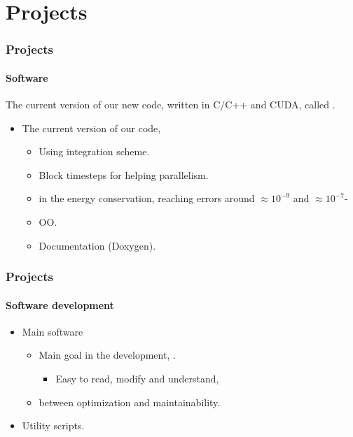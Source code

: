 \section{Projects}
\begin{frame}
    \frametitle{Projects}
    \framesubtitle{Software}

    The current version of our new {\nbody} code,
    written in C/C++ and CUDA, called {\GR}.

    \begin{itemize}
        \item The current version of our code,
        \begin{itemize}
            \item Using  integration scheme.
            \item Block timesteps for helping parallelism.
            \item {} in the energy conservation,
                reaching errors around $\approx 10^{-9}$ and $\approx 10^{-7}$-
            \item OO.
            \item Documentation (Doxygen).
        \end{itemize}
    \end{itemize}
\end{frame}

\begin{frame}
    \frametitle{Projects}
    \framesubtitle{Software development}

    \begin{itemize}
        \item Main software
        \begin{itemize}
            \item Main goal in the development, .
            \begin{itemize}
                \item Easy to read, modify and understand,
            \end{itemize}
            \item {} between optimization and maintainability.
        \end{itemize}
        \item Utility scripts.
    \end{itemize}
\end{frame}

